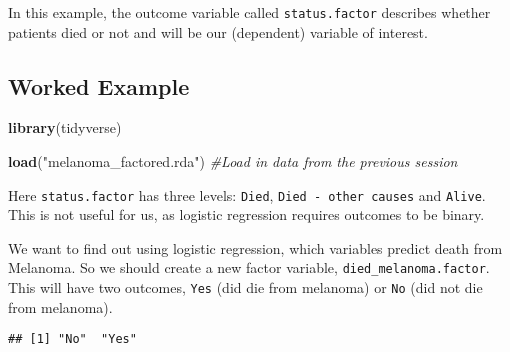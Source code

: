 \documentclass[]{book}
\makeatletter
\newenvironment{Shaded}{\begin{snugshade}}{\end{snugshade}}
\newcommand{\KeywordTok}[1]{\textcolor[rgb]{0.13,0.29,0.53}{\textbf{#1}}}
\newcommand{\StringTok}[1]{\textcolor[rgb]{0.31,0.60,0.02}{#1}}
\newcommand{\CommentTok}[1]{\textcolor[rgb]{0.56,0.35,0.01}{\textit{#1}}}
\newcommand{\OperatorTok}[1]{\textcolor[rgb]{0.81,0.36,0.00}{\textbf{#1}}}
\newcommand{\NormalTok}[1]{#1}
\newenvironment{kframe}{%
\medskip{}
\setlength{\fboxsep}{.8em}
 \def\at@end@of@kframe{}%
 \ifinner\ifhmode%
  \def\at@end@of@kframe{\end{minipage}}%
  \begin{minipage}{\columnwidth}%
 \fi\fi%
 \def\FrameCommand##1{\hskip\@totalleftmargin \hskip-\fboxsep
 \colorbox{shadecolor}{##1}\hskip-\fboxsep
     \hskip-\linewidth \hskip-\@totalleftmargin \hskip\columnwidth}%
 \MakeFramed {\advance\hsize-\width
   \@totalleftmargin\z@ \linewidth\hsize
   \@setminipage}}%
 {\par\unskip\endMakeFramed%
 \at@end@of@kframe}
\renewenvironment{Shaded}{\begin{kframe}}{\end{kframe}}
\theoremstyle{definition}
\theoremstyle{definition}
\theoremstyle{definition}
\theoremstyle{remark}
\makeatother
\begin{document}
In this example, the outcome variable called \texttt{status.factor}
describes whether patients died or not and will be our (dependent)
variable of interest.

\subsection{Worked Example}\label{worked-example}

\begin{Shaded}
\begin{Highlighting}[]
\KeywordTok{library}\NormalTok{(tidyverse)}

\KeywordTok{load}\NormalTok{(}\StringTok{"melanoma_factored.rda"}\NormalTok{)}
\CommentTok{#Load in data from the previous session}
\end{Highlighting}
\end{Shaded}

Here \texttt{status.factor} has three levels: \texttt{Died},
\texttt{Died\ -\ other\ causes} and \texttt{Alive}. This is not useful
for us, as logistic regression requires outcomes to be binary.

We want to find out using logistic regression, which variables predict
death from Melanoma. So we should create a new factor variable,
\texttt{died\_melanoma.factor}. This will have two outcomes,
\texttt{Yes} (did die from melanoma) or \texttt{No} (did not die from
melanoma).

\begin{Shaded}
\end{Shaded}

\begin{verbatim}
## [1] "No"  "Yes"
\end{verbatim}
\end{document}
